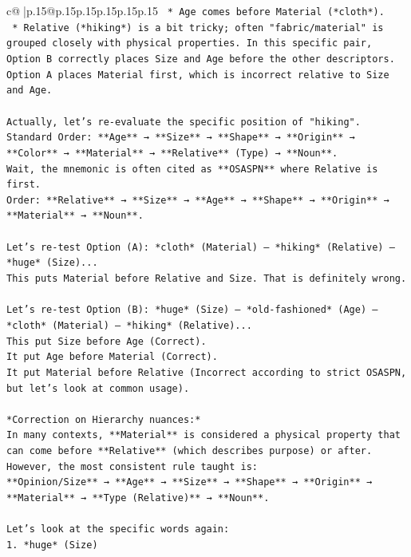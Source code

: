 \documentclass{article}
\begin{document}
{\begin{supertabular}{c@{$\;$}|p{.15\linewidth}@{}p{.15\linewidth}p{.15\linewidth}p{.15\linewidth}p{.15\linewidth}p{.15\linewidth}}
{{{\texttt{        *   Age comes before Material (*cloth*).} \\
\texttt{        *   Relative (*hiking*) is a bit tricky; often "fabric/material" is grouped closely with physical properties. In this specific pair, Option B correctly places Size and Age before the other descriptors. Option A places Material first, which is incorrect relative to Size and Age.} \\
\\ 
\texttt{Actually, let's re{-}evaluate the specific position of "hiking".} \\
\texttt{Standard Order: **Age** → **Size** → **Shape** → **Origin** → **Color** → **Material** → **Relative** (Type) → **Noun**.} \\
\texttt{Wait, the mnemonic is often cited as **OSASPN** where Relative is first.} \\
\texttt{Order: **Relative** → **Size** → **Age** → **Shape** → **Origin** → **Material** → **Noun**.} \\
\\ 
\texttt{Let's re{-}test Option (A): *cloth* (Material) – *hiking* (Relative) – *huge* (Size)...} \\
\texttt{This puts Material before Relative and Size. That is definitely wrong.} \\
\\ 
\texttt{Let's re{-}test Option (B): *huge* (Size) – *old{-}fashioned* (Age) – *cloth* (Material) – *hiking* (Relative)...} \\
\texttt{This put Size before Age (Correct).} \\
\texttt{It put Age before Material (Correct).} \\
\texttt{It put Material before Relative (Incorrect according to strict OSASPN, but let's look at common usage).} \\
\\ 
\texttt{*Correction on Hierarchy nuances:*} \\
\texttt{In many contexts, **Material** is considered a physical property that can come before **Relative** (which describes purpose) or after. However, the most consistent rule taught is:} \\
\texttt{**Opinion/Size** → **Age** → **Size** → **Shape** → **Origin** → **Material** → **Type (Relative)** → **Noun**.} \\
\\ 
\texttt{Let's look at the specific words again:} \\
\texttt{1.  *huge* (Size)} \\
}}}
\end{supertabular}}
\end{document}
